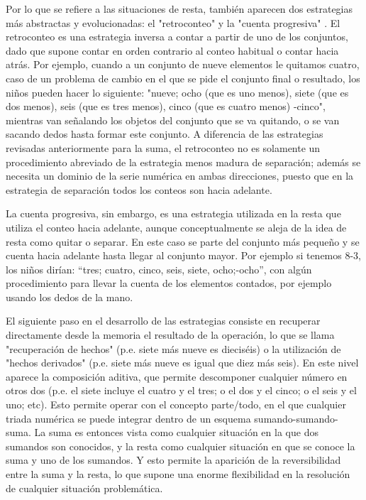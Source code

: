 \documentclass{article}
\begin{document}
Por lo que se refiere a las situaciones de resta, también aparecen dos estrategias más abstractas y evolucionadas: el "retroconteo" y la "cuenta progresiva" \cite{fuson1996levels}. El retroconteo es una estrategia inversa a contar a partir de uno de los conjuntos, dado que supone contar en orden contrario al conteo habitual o contar hacia atrás. Por ejemplo, cuando a un conjunto de nueve elementos le quitamos cuatro, caso de un problema de cambio en el que se pide el conjunto final o resultado, los niños pueden hacer lo siguiente: "nueve; ocho (que es uno menos), siete (que es dos menos), seis (que es tres menos), cinco (que es cuatro menos) -cinco", mientras van señalando los objetos del conjunto que se va quitando, o se van sacando dedos hasta formar este conjunto. A diferencia de las estrategias revisadas anteriormente para la suma, el retroconteo no es solamente un procedimiento abreviado de la estrategia menos madura de separación; además se necesita un dominio de la serie numérica en ambas direcciones, puesto que en la estrategia de separación todos los conteos son hacia adelante.

La cuenta progresiva, sin embargo, es una estrategia utilizada en la resta que utiliza el conteo hacia adelante, aunque conceptualmente se aleja de la idea de resta como quitar o separar. En este caso se parte del conjunto más pequeño y se cuenta hacia adelante hasta llegar al conjunto mayor. Por ejemplo si tenemos 8-3, los niños dirían: “tres; cuatro, cinco, seis, siete, ocho;-ocho”, con algún procedimiento para llevar la cuenta de los elementos contados, por ejemplo usando los dedos de la mano.

El siguiente paso en el desarrollo de las estrategias consiste en recuperar directamente desde la memoria el resultado de la operación, lo que se llama "recuperación de hechos" (p.e. siete más nueve es dieciséis) o la utilización de "hechos derivados" (p.e. siete más nueve es igual que diez más seis). En este nivel aparece la composición aditiva, que permite descomponer cualquier número en otros dos (p.e. el siete incluye el cuatro y el tres; o el dos y el cinco; o el seis y el uno; etc). Esto permite operar con el concepto parte/todo, en el que cualquier triada numérica se puede integrar dentro de un esquema sumando-sumando-suma. La suma es entonces vista como cualquier situación en la que dos sumandos son conocidos, y la resta como cualquier situación en que se conoce la suma y uno de los sumandos. Y esto permite la aparición de la reversibilidad entre la suma y la resta, lo que supone una enorme flexibilidad en la resolución de cualquier situación problemática.
\end{document}
